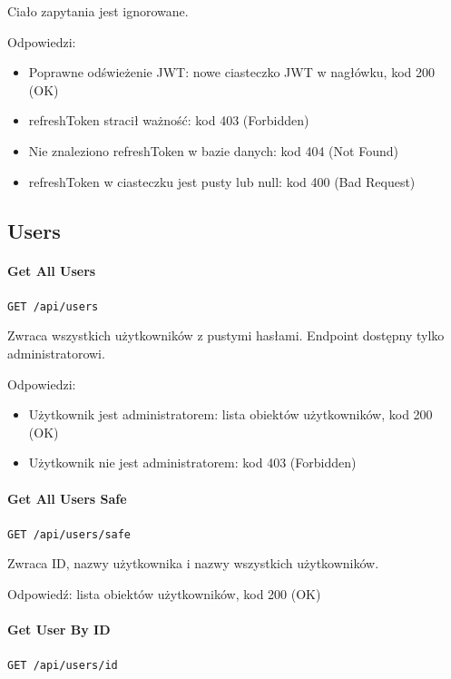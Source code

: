 \documentclass[a4paper,twoside,12pt]{book}
\begin{document}
Ciało zapytania jest ignorowane.

Odpowiedzi: 
\begin{itemize}
	\item Poprawne odświeżenie JWT: nowe ciasteczko JWT w nagłówku, kod 200 (OK) 
	\item refreshToken stracił ważność: kod 403 (Forbidden) 
	\item Nie znaleziono refreshToken w bazie danych: kod 404 (Not Found)
	\item refreshToken w ciasteczku jest pusty lub null: kod 400 (Bad Request)
\end{itemize}


\subsection{Users}\label{users}

\paragraph{Get All Users}\label{get-all-users}

\texttt{GET /api/users}

Zwraca wszystkich użytkowników z pustymi hasłami. Endpoint dostępny tylko administratorowi.

Odpowiedzi: 
\begin{itemize}
	\item Użytkownik jest administratorem: lista obiektów użytkowników, kod 200 (OK) 
	\item Użytkownik nie jest administratorem: kod 403 (Forbidden)
\end{itemize}

\paragraph{Get All Users Safe}\label{get-all-users-safe}

\texttt{GET /api/users/safe}

Zwraca ID, nazwy użytkownika i nazwy wszystkich użytkowników.

Odpowiedź: lista obiektów użytkowników, kod 200 (OK)

\paragraph{Get User By ID}\label{get-user-by-id}

\texttt{GET /api/users/{id}}
\end{document}
